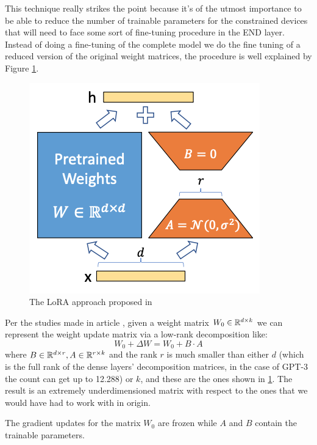 This technique really strikes the point because it's of the utmost importance to be able to reduce
the number of trainable parameters for the constrained devices that will need to face some sort of
fine-tuning procedure in the END layer. Instead of doing a fine-tuning of the complete model we do
the fine tuning of a reduced version of the original weight matrices, the procedure is well
explained by Figure \ref{fig:lora}.
\begin{figure}
	\label{fig:lora}
	\centering
	\includegraphics[scale=0.7]{figures/lora.png}
	\caption{The LoRA approach proposed in \cite{lora}}
\end{figure}
Per the studies made in article \cite{lora}, given a weight matrix $W_0 \in \mathbb{R}^{d \times k}$ we can
represent the weight update matrix via a low-rank decomposition like:
\begin{equation}
	W_0 + \Delta W = W_0 + B \cdot A
\end{equation}
where $B \in \mathbb{R}^{d \times r}, A \in \mathbb{R}^{r \times k}$ and the rank $r$ is much smaller than either
$d$ (which is the full rank of the dense layers' decomposition matrices, in the case of GPT-3 the
count can get up to 12.288) or $k$, and these are the ones shown in \ref{fig:lora}. The result is an
extremely underdimensioned matrix with respect to the ones that we would have had to work with in
origin.

The gradient updates for the matrix $W_0$ are frozen while $A$ and $B$ contain the trainable
parameters.

